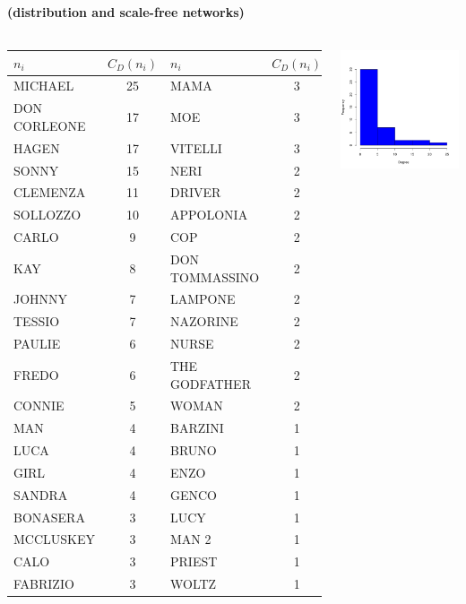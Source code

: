 \documentclass[8pt]{beamer}
\begin{document}

\begin{frame}
\frametitle{\insertsection}
\framesubtitle{\insertsubsection \hspace{0.05cm} (distribution and scale-free networks)}

\begin{columns}[c]

\centering
\tiny
\begin{tabular}{lc|lc}
\toprule
$n_i$ & $C_D(n_i)$ & $n_i$ & $C_D(n_i)$ \\
\hline
MICHAEL      & 25 & MAMA           & 3 \\
DON CORLEONE & 17 & MOE            & 3 \\
HAGEN        & 17 & VITELLI        & 3 \\
SONNY        & 15 & NERI           & 2 \\
CLEMENZA     & 11 & DRIVER         & 2 \\
SOLLOZZO     & 10 & APPOLONIA      & 2 \\
CARLO        & 9  & COP            & 2 \\
KAY          & 8  & DON TOMMASSINO & 2 \\
JOHNNY       & 7  & LAMPONE        & 2 \\
TESSIO       & 7  & NAZORINE       & 2 \\
PAULIE       & 6  & NURSE          & 2 \\
FREDO        & 6  & THE GODFATHER  & 2 \\
CONNIE       & 5  & WOMAN          & 2 \\
MAN          & 4  & BARZINI        & 1 \\
LUCA         & 4  & BRUNO          & 1 \\
GIRL         & 4  & ENZO           & 1 \\
SANDRA       & 4  & GENCO          & 1 \\
BONASERA     & 3  & LUCY           & 1 \\
MCCLUSKEY    & 3  & MAN 2          & 1 \\
CALO         & 3  & PRIEST         & 1 \\
FABRIZIO     & 3  & WOLTZ          & 1 \\
\bottomrule
\end{tabular}

\includegraphics[width=5cm]{gf_dist}


\end{columns}
\end{frame}
\end{document}
